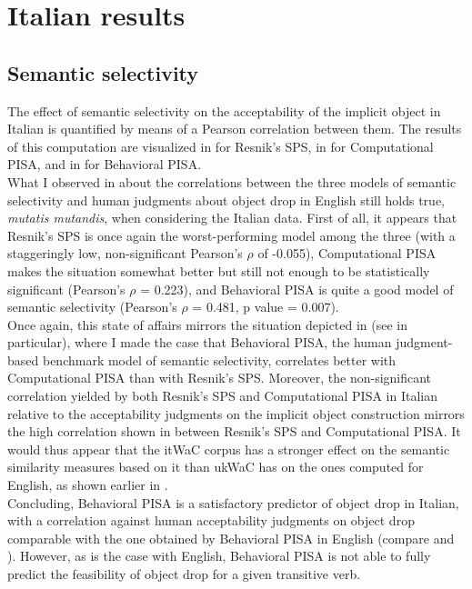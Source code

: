 \section{Italian results} 

\subsection{Semantic selectivity} 

The effect of semantic selectivity on the acceptability of the implicit object in Italian is quantified by means of a Pearson correlation between them. The results of this computation are visualized in  for Resnik's SPS, in  for Computational PISA, and in  for Behavioral PISA.\\
What I observed in  about the correlations between the three models of semantic selectivity and human judgments about object drop in English still holds true, \textit{mutatis mutandis}, when considering the Italian data. First of all, it appears that Resnik's SPS is once again the worst-performing model among the three (with a staggeringly low, non-significant Pearson's $\rho$ of -0.055), Computational PISA makes the situation somewhat better but still not enough to be statistically significant (Pearson's $\rho$ = 0.223), and Behavioral PISA is quite a good model of semantic selectivity (Pearson's $\rho$ = 0.481, p value = 0.007).\\
Once again, this state of affairs mirrors the situation depicted in  (see  in particular), where I made the case that Behavioral PISA, the human judgment-based benchmark model of semantic selectivity, correlates better with Computational PISA than with Resnik's SPS. Moreover, the non-significant correlation yielded by both Resnik's SPS and Computational PISA in Italian relative to the acceptability judgments on the implicit object construction mirrors the high correlation shown in  between Resnik's SPS and Computational PISA. It would thus appear that the itWaC corpus has a stronger effect on the semantic similarity measures based on it than ukWaC has on the ones computed for English, as shown earlier in .\\
Concluding, Behavioral PISA is a satisfactory predictor of object drop in Italian, with a correlation against human acceptability judgments on object drop comparable with the one obtained by Behavioral PISA in English (compare  and ). However, as is the case with English, Behavioral PISA is not able to fully predict the feasibility of object drop for a given transitive verb.

